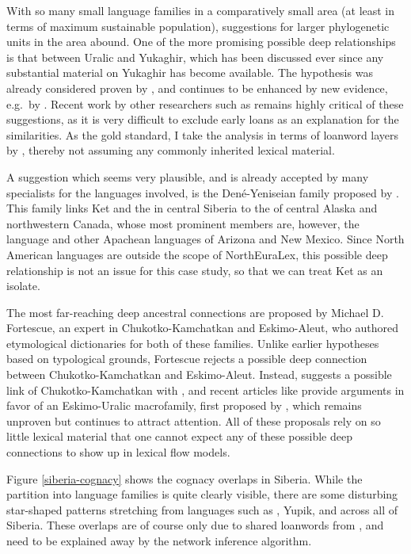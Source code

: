 With so many small language families in a comparatively small area (at least in terms of maximum sustainable population), suggestions for larger phylogenetic units in the area abound. One of the more promising possible deep relationships is that between Uralic and Yukaghir, which has been discussed ever since any substantial material on Yukaghir has become available. The hypothesis was already considered proven by \cite{collinder1940}, and continues to be enhanced by new evidence, e.g.\ by \cite{piispanen2013}. Recent work by other researchers such as \cite{aikio2014} remains highly critical of these suggestions, as it is very difficult to exclude early loans as an explanation for the similarities. As the gold standard, I take the analysis in terms of loanword layers by \cite{hakkinen2012}, thereby not assuming any commonly inherited lexical material.

A suggestion which seems very plausible, and is already accepted by many specialists for the languages involved, is the Den\'{e}-Yeniseian family proposed by \cite{vajda2010}. This family links Ket and the  in central Siberia to the  of central Alaska and northwestern Canada, whose most prominent members are, however, the  language and other Apachean languages of Arizona and New Mexico. Since North American languages are outside the scope of NorthEuraLex, this possible deep relationship is not an issue for this case study, so that we can treat Ket as an isolate.

The most far-reaching deep ancestral connections are proposed by Michael D. Fortescue, an expert in Chukotko-Kamchatkan and Eskimo-Aleut, who authored etymological dictionaries for both of these families. Unlike earlier hypotheses based on typological grounds, Fortescue rejects a possible deep connection between Chukotko-Kamchatkan and Eskimo-Aleut. Instead, \cite{fortescue2011} suggests a possible link of Chukotko-Kamchatkan with , and recent articles like \cite{fortescue2016} provide arguments in favor of an Eskimo-Uralic macrofamily, first proposed by \cite{bergsland1959}, which remains unproven but continues to attract attention. All of these proposals rely on so little lexical material that one cannot expect any of these possible deep connections to show up in lexical flow models.

Figure \ref{siberia-cognacy} shows the cognacy overlaps in Siberia. While the partition into language families is quite clearly visible, there are some disturbing star-shaped patterns stretching from languages such as , Yupik, and  across all of Siberia. These overlaps are of course only due to shared loanwords from , and need to be explained away by the network inference algorithm.

